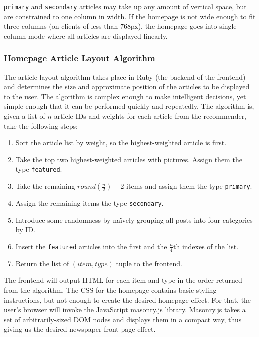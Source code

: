 \documentclass[11pt,letterpaper]{article}
\begin{document}
\verb+primary+ and \verb+secondary+ articles may take up any amount of vertical space, but are constrained to one column in width.
If the homepage is not wide enough to fit three columns (on clients of less than 768px), the homepage goes into single-column mode where all articles are displayed linearly.

\subsubsection{Homepage Article Layout Algorithm}
The article layout algorithm takes place in Ruby (the backend of the frontend) and determines the size and approximate position of the articles to be displayed to the user.
The algorithm is complex enough to make intelligent decisions, yet simple enough that it can be performed quickly and repeatedly.
The algorithm is, given a list of $n$ article IDs and weights for each article from the recommender, take the following steps:

\begin{enumerate}
\item Sort the article list by weight, so the highest-weighted article is first.
\item Take the top two highest-weighted articles with pictures. Assign them the type \verb+featured+.
\item Take the remaining $round(\frac{n}{2}) - 2$ items and assign them the type \verb+primary+.
\item Assign the remaining items the type \verb+secondary+.
\item Introduce some randomness by na\"{i}vely grouping all posts into four categories by ID.
\item Insert the \verb+featured+ articles into the first and the $\frac{n}{4}$th indexes of the list.
\item Return the list of $(item, type)$ tuple to the frontend.
\end{enumerate}

The frontend will output HTML for each item and type in the order returned from the algorithm.
The CSS for the homepage contains basic styling instructions, but not enough to create the desired homepage effect.
For that, the user's browser will invoke the JavaScript masonry.js library\cite{masonry}.
Masonry.js takes a set of arbitrarily-sized DOM nodes and displays them in a compact way, thus giving us the desired newspaper front-page effect.
\end{document}
